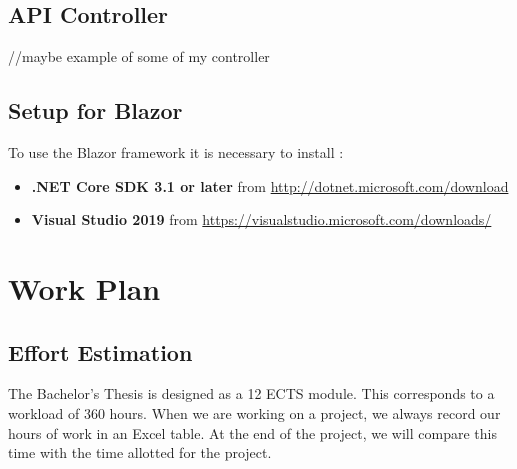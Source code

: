 \documentclass{scrartcl}
\begin{document}
\subsection{API Controller}

//maybe example of some of my controller









\subsection{Setup for Blazor}
To use the Blazor framework it is necessary to install :\\
\begin{itemize}
\item \textbf{.NET Core SDK 3.1 or later} from \url {http://dotnet.microsoft.com/download}
\item \textbf{Visual Studio 2019} from \url {https://visualstudio.microsoft.com/downloads/}
\end{itemize}








\section{Work Plan}
  		\subsection{Effort Estimation}
  		
  		The Bachelor's Thesis  is designed as a 12 ECTS module. This corresponds to a workload of 360 hours. When we are working on a project, we always record our hours of work in an Excel table.
 At the end of the project, we will compare this time with the time allotted for the project. 		
  		
\end{document}
